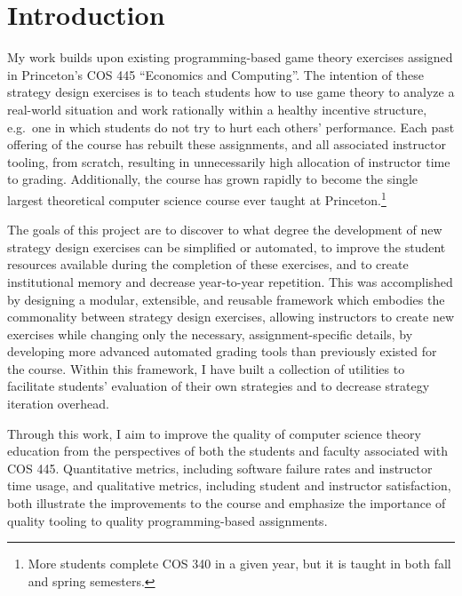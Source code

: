 \documentclass[pageno]{jpaper}
\begin{document}
\section*{Introduction}
My work builds upon existing programming-based game theory exercises assigned in Princeton's COS 445 ``Economics and Computing''.
The intention of these strategy design exercises is to teach students how to use game theory to analyze a real-world situation and work rationally within a healthy incentive structure, e.g.\ one in which students do not try to hurt each others’ performance.
Each past offering of the course has rebuilt these assignments, and all associated instructor tooling, from scratch, resulting in unnecessarily high allocation of instructor time to grading.
Additionally, the course has grown rapidly to become the single largest theoretical computer science course ever taught at Princeton.\footnote{More students complete COS 340 in a given year, but it is taught in both fall and spring semesters.}~\cite{coursesizes}

The goals of this project are to discover to what degree the development of new strategy design exercises can be simplified or automated, to improve the student resources available during the completion of these exercises, and to create institutional memory and decrease year-to-year repetition.
This was accomplished by designing a modular, extensible, and reusable framework which embodies the commonality between strategy design exercises, allowing instructors to create new exercises while changing only the necessary, assignment-specific details, by developing more advanced automated grading tools than previously existed for the course.
Within this framework, I have built a collection of utilities to facilitate students' evaluation of their own strategies and to decrease strategy iteration overhead.

Through this work, I aim to improve the quality of computer science theory education from the perspectives of both the students and faculty associated with COS 445.
Quantitative metrics, including software failure rates and instructor time usage, and qualitative metrics, including student and instructor satisfaction, both illustrate the improvements to the course and emphasize the importance of quality tooling to quality programming-based assignments.
\end{document}
